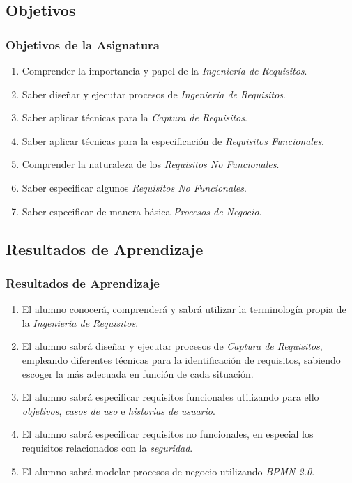 \documentclass[a4paper,slidestop,xcolor=pst,dvips,blue]{beamer}
\begin{document}
\subsection{Objetivos}

\begin{frame}[c]
	\frametitle{Objetivos de la Asignatura}
    \begin{enumerate}[<+->]
			\item Comprender la importancia y papel de la \emph{Ingeniería de Requisitos}.
            \item Saber diseñar y ejecutar procesos de \emph{Ingeniería de Requisitos}.
			\item Saber aplicar técnicas para la \emph{Captura de Requisitos}.
			\item Saber aplicar técnicas para la especificación de \emph{Requisitos Funcionales}.
			\item Comprender la naturaleza de los \emph{Requisitos No Funcionales}.
			\item Saber especificar algunos \emph{Requisitos No Funcionales}.
			\item Saber especificar de manera básica \emph{Procesos de Negocio}.
	 \end{enumerate}
\end{frame}

\subsection{Resultados de Aprendizaje}

\begin{frame}[c]
	\frametitle{Resultados de Aprendizaje}
    	\begin{enumerate}[<+->]
			\item El alumno conocerá, comprenderá y sabrá utilizar la terminología propia de la \emph{Ingeniería de Requisitos}.
            \item El alumno sabrá diseñar y ejecutar procesos de \emph{Captura de Requisitos}, empleando diferentes técnicas para la identificación de requisitos, sabiendo escoger la más adecuada en función de cada situación.
            \item El alumno sabrá especificar requisitos funcionales utilizando para ello \emph{objetivos}, \emph{casos de uso} e \emph{historias de usuario}.
            \item El alumno sabrá especificar requisitos no funcionales, en especial los requisitos relacionados con la \emph{seguridad}.
            \item El alumno sabrá modelar procesos de negocio utilizando  \emph{BPMN 2.0}.
		\end{enumerate}
\end{frame}
\end{document}
